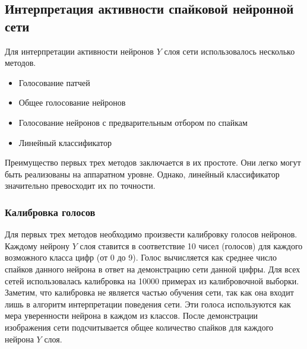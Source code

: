 \documentclass[a4paper]{article}
\begin{document}
\subsection{Интерпретация активности спайковой нейронной сети}

Для интерпретации активности нейронов $Y$ слоя сети использовалось несколько методов.

\begin{itemize}
 \item Голосование патчей
 \item Общее голосование нейронов
 \item Голосование нейронов с предварительным отбором по спайкам
 \item Линейный классификатор
\end{itemize}

Преимущество первых трех методов заключается в их простоте. Они легко могут быть реализованы на аппаратном уровне. Однако, линейный классификатор значительно превосходит их по точности.\\

\subsubsection{Калибровка голосов} \label{calibration}
Для первых трех методов необходимо произвести калибровку голосов нейронов. Каждому нейрону $Y$ слоя ставится в соответствие 10 чисел (голосов) для каждого возможного класса цифр (от 0 до 9). Голос вычисляется как среднее число спайков данного нейрона в ответ на демонстрацию сети данной цифры. Для всех сетей использовалась калибровка на 10000 примерах из калибровочной выборки. Заметим, что калибровка не является частью обучения сети, так как она входит лишь в алгоритм интерпретации поведения сети. Эти голоса используются как мера уверенности нейрона в каждом из классов. После демонстрации изображения сети подсчитывается общее количество спайков для каждого нейрона $Y$ слоя.
\end{document}
